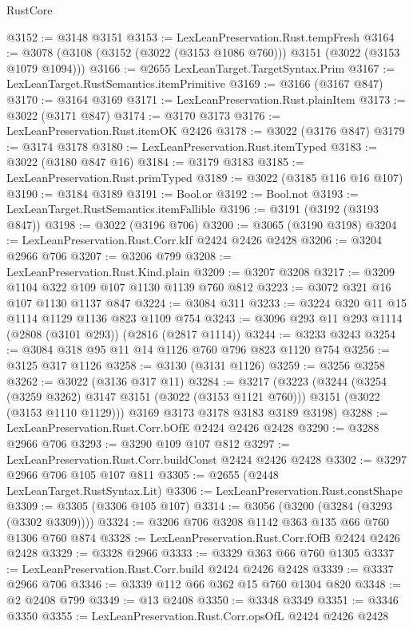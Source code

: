 \begin{lexlean}{RustCore}
\begin{coremodule}
@3152 := @3148 @3151
@3153 := LexLeanPreservation.Rust.tempFresh
@3164 := @3078 (@3108 (@3152 (@3022 (@3153 @1086 @760))) @3151 (@3022 (@3153 @1079 @1094)))
@3166 := @2655 LexLeanTarget.TargetSyntax.Prim
@3167 := LexLeanTarget.RustSemantics.itemPrimitive
@3169 := @3166 (@3167 @847)
@3170 := @3164 @3169
@3171 := LexLeanPreservation.Rust.plainItem
@3173 := @3022 (@3171 @847)
@3174 := @3170 @3173
@3176 := LexLeanPreservation.Rust.itemOK @2426
@3178 := @3022 (@3176 @847)
@3179 := @3174 @3178
@3180 := LexLeanPreservation.Rust.itemTyped
@3183 := @3022 (@3180 @847 @16)
@3184 := @3179 @3183
@3185 := LexLeanPreservation.Rust.primTyped
@3189 := @3022 (@3185 @116 @16 @107)
@3190 := @3184 @3189
@3191 := Bool.or
@3192 := Bool.not
@3193 := LexLeanTarget.RustSemantics.itemFallible
@3196 := @3191 (@3192 (@3193 @847))
@3198 := @3022 (@3196 @706)
@3200 := @3065 (@3190 @3198)
@3204 := LexLeanPreservation.Rust.Corr.kIf @2424 @2426 @2428
@3206 := @3204 @2966 @706
@3207 := @3206 @799
@3208 := LexLeanPreservation.Rust.Kind.plain
@3209 := @3207 @3208
@3217 := @3209 @1104 @322 @109 @107 @1130 @1139 @760 @812
@3223 := @3072 @321 @16 @107 @1130 @1137 @847
@3224 := @3084 @311
@3233 := @3224 @320 @11 @15 @1114 @1129 @1136 @823 @1109 @754
@3243 := @3096 @293 @11 @293 @1114 (@2808 (@3101 @293)) (@2816 (@2817 @1114))
@3244 := @3233 @3243
@3254 := @3084 @318 @95 @11 @14 @1126 @760 @796 @823 @1120 @754
@3256 := @3125 @317 @1126
@3258 := @3130 (@3131 @1126)
@3259 := @3256 @3258
@3262 := @3022 (@3136 @317 @11)
@3284 := @3217
    (@3223
      (@3244
        (@3254 (@3259 @3262) @3147 @3151 (@3022 (@3153 @1121 @760)))
        @3151
        (@3022 (@3153 @1110 @1129)))
      @3169
      @3173
      @3178
      @3183
      @3189
      @3198)
@3288 := LexLeanPreservation.Rust.Corr.bOfE @2424 @2426 @2428
@3290 := @3288 @2966 @706
@3293 := @3290 @109 @107 @812
@3297 := LexLeanPreservation.Rust.Corr.buildConst @2424 @2426 @2428
@3302 := @3297 @2966 @706 @105 @107 @811
@3305 := @2655 (@2448 LexLeanTarget.RustSyntax.Lit)
@3306 := LexLeanPreservation.Rust.constShape
@3309 := @3305 (@3306 @105 @107)
@3314 := @3056 (@3200 (@3284 (@3293 (@3302 @3309))))
@3324 := @3206 @706 @3208 @1142 @363 @135 @66 @760 @1306 @760 @874
@3328 := LexLeanPreservation.Rust.Corr.fOfB @2424 @2426 @2428
@3329 := @3328 @2966
@3333 := @3329 @363 @66 @760 @1305
@3337 := LexLeanPreservation.Rust.Corr.build @2424 @2426 @2428
@3339 := @3337 @2966 @706
@3346 := @3339 @112 @66 @362 @15 @760 @1304 @820
@3348 := @2 @2408 @799
@3349 := @13 @2408
@3350 := @3348 @3349
@3351 := @3346 @3350
@3355 := LexLeanPreservation.Rust.Corr.opsOfL @2424 @2426 @2428

\end{coremodule}
\end{lexlean}
